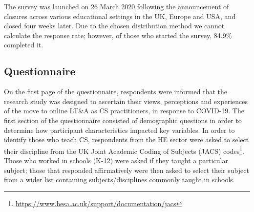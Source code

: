 \documentclass[conference]{IEEEtran}
\begin{document}
The survey was launched on 26 March 2020 following the announcement of
closures across various educational settings in the UK, Europe and
USA, and closed four weeks later. Due to the chosen distribution method we
cannot calculate the response rate; however, of those who started the
survey, 84.9\% completed it.

\subsection{Questionnaire}


On the first page of the questionnaire, respondents were informed that
the research study was designed to ascertain their views, perceptions
and experiences of the move to online LT\&A as CS practitioners, in
response to COVID-19. The first section of the questionnaire consisted
of demographic questions in order to determine how participant
characteristics impacted key variables. In order to identify those who
teach CS, respondents from the HE sector were asked to select their
discipline from the UK Joint Academic Coding of Subjects (JACS)
codes\footnote{\url{https://www.hesa.ac.uk/support/documentation/jacs}}. Those
who worked in schools (K-12) were asked if they taught a particular
subject; those that responded affirmatively were then asked to select
their subject from a wider list containing subjects/disciplines
commonly taught in schools.

\end{document}
